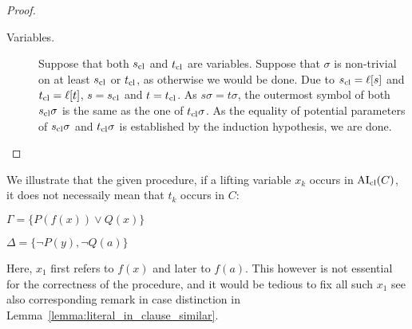 \documentclass[,%
	paper=a4,%
	DIV12, %
	twoside=false,%
	liststotoc,
	bibtotoc,
	draft=false,%
	numbers=noendperiod
]{scrartcl}
\begin{document}
\begin{proof}
\begin{description}
		\item[Variables.]
			Suppose that both $s_\mathrm{cl}$ and $t_\mathrm{cl}$ are variables. 
			Suppose that $\sigma$ is non-trivial on at least $s_\mathrm{cl}$ or $t_\mathrm{cl}$, as otherwise we would be done.
			Due to $s_\mathrm{cl} = \ell[s]$ and $t_\mathrm{cl} = \ell[t]$, $s = s_\mathrm{cl}$ and $t=t_\mathrm{cl}$.
			As $s\sigma=t\sigma$,  the outermost symbol of both $s_\mathrm{cl}\sigma$ is the same as the one of $t_\mathrm{cl}\sigma$. As the equality of potential parameters of $s_\mathrm{cl}\sigma$ and $t_\mathrm{cl}\sigma$ is established by the induction hypothesis, we are done.
			\qedhere
	\end{description}
\end{proof}

\begin{exa} 
	\label{exa:lifting_var_refers_to_different_term}
	We illustrate that the given procedure, if a lifting variable $x_k$ occurs in $\operatorname{AI}_\mathrm{cl}(C)$, it does not necessaily mean that $t_k$ occurs in $C$:

	$\Gamma = \{P(f(x))\lor Q(x)\}$

	$\Delta = \{\lnot P(y), \lnot Q(a)\}$
	\begin{prooftree}



	\end{prooftree}
	Here, $x_1$ first refers to $f(x)$ and later to $f(a)$.
	This however is not essential for the correctness of the procedure, and it would be tedious to fix all such $x_1$ see also corresponding remark in case distinction in Lemma~\ref{lemma:literal_in_clause_similar}.
\end{exa} 
\end{document}
